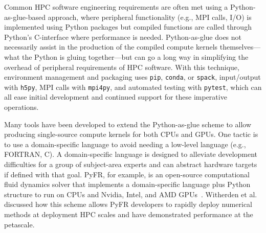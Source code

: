 Common HPC software engineering requirements are often met using a Python-as-glue-based approach, where peripheral functionality (e.g., MPI calls, I/O) is implemented using Python packages but compiled functions are called through Python's C-interface where performance is needed.
Python-as-glue does not necessarily assist in the production of the compiled compute kernels themselves---what the Python is gluing together---but can go a long way in simplifying the overhead of peripheral requirements of HPC software.
With this technique, environment management and packaging uses \texttt{pip}, \texttt{conda}, or \texttt{spack}, input/output with \texttt{h5py}, MPI calls with \texttt{mpi4py}, 
and automated testing with \texttt{pytest}, which can all ease initial development and continued support for these imperative operations. 

Many tools have been developed to extend the Python-as-glue scheme to allow producing single-source compute kernels for both CPUs and GPUs.
One tactic is to use a domain-specific language to avoid needing a low-level language (e.g., FORTRAN, C).
A domain-specific language is designed to alleviate development difficulties for a group of subject-area experts and can abstract hardware targets if defined with that goal.
PyFR, for example, is an open-source computational fluid dynamics solver that implements a domain-specific language plus Python structure to run on CPUs and Nvidia, Intel, and AMD GPUs~\cite{pyfrPetascale}. 
Witherden et al.~\cite{pyfrPetascale} discussed how this scheme allows PyFR developers to rapidly deploy numerical methods at deployment HPC scales and have demonstrated performance at the petascale.

